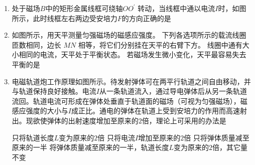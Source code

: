 \begin{enumerate}

\item
{}
处于磁场$ B $中的矩形金属线框可绕轴$ OO ^{\prime} $ 转动，当线框中通以电流$ I $时，如图所示，此时线框左右两边受安培力$ F $的方向正确的是  
\begin{figure}[h!]
\centering

\end{figure}

\pfourchoices
{}
{}
{}
{}






\item
{}
如图所示，用天平测量匀强磁场的磁感应强度。 下列各选项所示的载流线圈匝数相同，边长 $ MN $ 相等，将它们分别挂在天平的右臂下方。 线圈中通有大小相同的电流，天平处于平衡状态。 若磁场发生微小变化，天平最容易失去平衡的是  
\begin{figure}[h!]
\centering

\end{figure}

\pfourchoices
{}
{}
{}
{}



\item
{}
电磁轨道炮工作原理如图所示。待发射弹体可在两平行轨道之间自由移动，并与轨道保持良好接触。电流$ I $从一条轨道流入，通过导电弹体后从另一条轨道流回。轨道电流可形成在弹体处垂直于轨道面的磁场（可视为匀强磁场），磁感应强度的大小与$ I $成正比。通电的弹体在轨道上受到安培力的作用而高速射出。现欲使弹体的出射速度增加至原来的$ 2 $倍，理论上可采用的办法是  
\begin{figure}[h!]
\centering

\end{figure}


\fourchoices
{只将轨道长度$ L $变为原来的$ 2 $倍}
{只将电流$ I $增加至原来的$ 2 $倍}
{只将弹体质量减至原来的一半}
{将弹体质量减至原来的一半，轨道长度$ L $变为原来的$ 2 $倍，其它量不变}






\end{enumerate}
